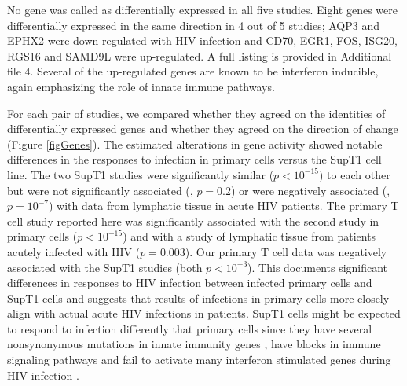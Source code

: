 \documentclass[../sherrill-Mix_thesis.tex]{subfiles}
\begin{document}
		No gene was called as differentially expressed in all five studies. Eight genes were differentially expressed in the same direction in 4 out of 5 studies; AQP3 and EPHX2 were down-regulated with HIV infection and CD70, EGR1, FOS, ISG20, RGS16 and SAMD9L were up-regulated. A full listing is provided in Additional file 4. Several of the up-regulated genes are known to be interferon inducible, again emphasizing the role of innate immune pathways.

			For each pair of studies, we compared whether they agreed on the identities of differentially expressed genes and whether they agreed on the direction of change (Figure \ref{figGenes}). The estimated alterations in gene activity showed notable differences in the responses to infection in primary cells versus the SupT1 cell line. The two SupT1 studies were significantly similar ($p<10^{-15}$) to each other but were not significantly associated (\citet{Lefebvre2011}, $p=0.2$) or were negatively associated (\citet{Chang2011}, $p=10^{-7}$) with data from lymphatic tissue in acute HIV patients. The primary T cell study reported here was significantly associated with the second study in primary cells ($p<10^{-15}$) and with a study of lymphatic tissue from patients acutely infected with HIV ($p=0.003$).  Our primary T cell data was negatively associated with the SupT1 studies (both $p<10^{-3}$). This documents significant differences in responses to HIV infection between infected primary cells and SupT1 cells and suggests that results of infections in primary cells more closely align with actual acute HIV infections in patients.  SupT1 cells might be expected to respond to infection differently that primary cells since they have several nonsynonymous mutations in innate immunity genes \citep{KalenderAtak2012}, have blocks in immune signaling pathways \citep{Patel2012} and fail to activate many interferon stimulated genes during HIV infection \citep{Mohammadi2013}. 
	
\end{document}
